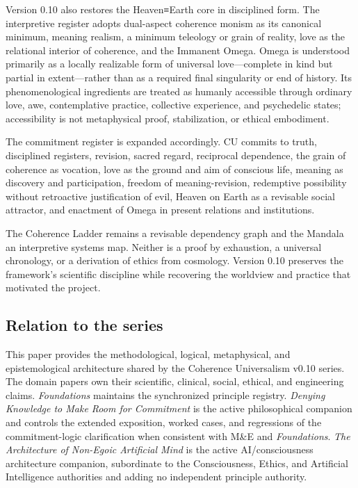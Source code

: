\documentclass[
  11pt,
]{article}
\begin{document}
Version 0.10 also restores the Heaven≡Earth core in disciplined form.
The interpretive register adopts dual-aspect coherence monism as its
canonical minimum, meaning realism, a minimum teleology or grain of
reality, love as the relational interior of coherence, and the Immanent
Omega. Omega is understood primarily as a locally realizable form of
universal love---complete in kind but partial in extent---rather than as
a required final singularity or end of history. Its phenomenological
ingredients are treated as humanly accessible through ordinary love,
awe, contemplative practice, collective experience, and psychedelic
states; accessibility is not metaphysical proof, stabilization, or
ethical embodiment.

The commitment register is expanded accordingly. CU commits to truth,
disciplined registers, revision, sacred regard, reciprocal dependence,
the grain of coherence as vocation, love as the ground and aim of
conscious life, meaning as discovery and participation, freedom of
meaning-revision, redemptive possibility without retroactive
justification of evil, Heaven on Earth as a revisable social attractor,
and enactment of Omega in present relations and institutions.

The Coherence Ladder remains a revisable dependency graph and the
Mandala an interpretive systems map. Neither is a proof by exhaustion, a
universal chronology, or a derivation of ethics from cosmology. Version
0.10 preserves the framework's scientific discipline while recovering
the worldview and practice that motivated the project.

\subsection{Relation to the series}\label{relation-to-the-series}

This paper provides the methodological, logical, metaphysical, and
epistemological architecture shared by the Coherence Universalism v0.10
series. The domain papers own their scientific, clinical, social,
ethical, and engineering claims. \emph{Foundations} maintains the
synchronized principle registry. \emph{Denying Knowledge to Make Room
for Commitment} is the active philosophical companion and controls the
extended exposition, worked cases, and regressions of the
commitment-logic clarification when consistent with M\&E and
\emph{Foundations}. \emph{The Architecture of Non-Egoic Artificial Mind}
is the active AI/consciousness architecture companion, subordinate to
the Consciousness, Ethics, and Artificial Intelligence authorities and
adding no independent principle authority.
\end{document}
